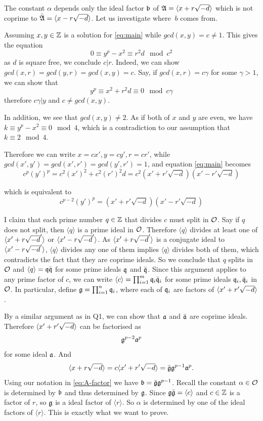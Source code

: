 The constant $\alpha$ depends only the ideal factor $\mathfrak{b}$ of $\mathfrak{A} = \langle x + r\sqrt{-d}\rangle$ which is not coprime to $\bar{\mathfrak{A}} = \langle x - r \sqrt{-d}\rangle$. 
Let us investigate where $\ b$ comes from.

Assuming $x, y \in \mathbb{Z}$ is a solution for \ref{eq:main} while $gcd(x, y) = c \neq 1$.
This gives the equation
$$
	0 \equiv y^p - x^2 \equiv r^2d \mod c^2
$$
as $d$ is square free, we conclude $c | r$.
Indeed, we can show $gcd(x,r) = gcd(y,r) = gcd(x, y) = c$.
Say, if $gcd(x, r) = c \gamma$ for some $\gamma > 1$, we can show that 
$$
y^p \equiv x^2 + r^2d \equiv 0 \mod c \gamma
$$
therefore $c \gamma | y$ and $c \neq gcd(x, y)$.

In addition, we see that $gcd(x, y)\neq 2$. 
As if both of $ x$ and $ y$ are even, we have $k \equiv y^p - x^2 \equiv 0 \mod 4$, which is a contradiction to our assumption that $k \equiv 2 \mod 4$.

Therefore we can write $x = cx', y = cy', r = cr'$, while $gcd(x', y') = gcd(x', r') = gcd(y', r') = 1$, and equation \ref{eq:main} becomes 
\begin{equation}
	c^{p} (y')^p = c^2(x')^2 + c^2(r')^2 d = c^2 (x' + r' \sqrt{-d})(x' - r' \sqrt{-d})
\end{equation}

which is equivalent to 
\begin{equation}\label{eq:q2-coprime}
	c^{p-2} (y')^p = (x' + r' \sqrt{-d})(x' - r' \sqrt{-d})
\end{equation}

I claim that each prime number $q \in \mathbb{Z}$ that divides $c$ must split in $\mathcal{O}$.
Say if $q$ does not split, then $\langle q \rangle$ is a prime ideal in $\mathcal{O}$.
Therefore $\langle q\rangle$ divides at least one of $\langle x' + r\sqrt{-d}'\rangle$ or $\langle x' - r\sqrt{-d}'\rangle$.
As $\langle x' + r\sqrt{-d}'\rangle$ is a conjugate ideal to $\langle x' - r\sqrt{-d}'\rangle$, $\langle q\rangle$ divides any one of them implies $\langle q\rangle$ divides both of them, which contradicts the fact that they are coprime ideals.
So we conclude that $q$ splits in $\mathcal{O}$ and $\langle q\rangle = \mathfrak{q}\bar{\mathfrak{q}}$ for some prime ideals $\mathfrak{q}$ and $\bar{\mathfrak{q}}$.
Since this argument applies to any prime factor of $c$, we can write $\langle c \rangle = \prod_{i=1}^m \mathfrak{q}_i \bar{\mathfrak{q}}_i$ for some prime ideals $\mathfrak{q}_i, \bar{\mathfrak{q}}_i$ in $\mathcal{O}$. 
In particular, define $\mathfrak{g} = \prod_{i=1}^n \mathfrak{q}_i$, where each of $\mathfrak{q}_i$ are factors of $\langle x ' + r'\sqrt{-d} \rangle$.

By a similar argument as in Q1, we can show that $\mathfrak{a}$ and $\bar{\mathfrak{a}}$ are coprime ideals. 
Therefore $\langle x' + r' \sqrt{-d}\rangle$ can be factorised as 
$$
\mathfrak{g}^{p-2} \mathfrak{a}^p 
$$
for some ideal $\mathfrak{a}$. 
And 
$$
\langle x + r\sqrt{-d}\rangle = c \langle x' + r' \sqrt{-d}\rangle = \bar{\mathfrak{g}} \mathfrak{g}^{p-1} \mathfrak{a}^p.
$$
Using our notation in \eqref{eq:A-factor} we have $\mathfrak{b} = \bar{\mathfrak{g}} \mathfrak{g}^{p-1}$.
Recall the constant $\alpha \in \mathcal{O}$ is determined by $\mathfrak{b}$ and thus determined by $\mathfrak{g}$.
Since $\mathfrak{g}\bar{\mathfrak{g}} = \langle c\rangle$ and $c \in \mathbb{Z}$ is a factor of $r$, so $\mathfrak{g}$ is a ideal factor of $\langle r\rangle$.
So $\alpha$ is determined by one of the ideal factors of $\langle r\rangle$.
This is exactly what we want to prove.

